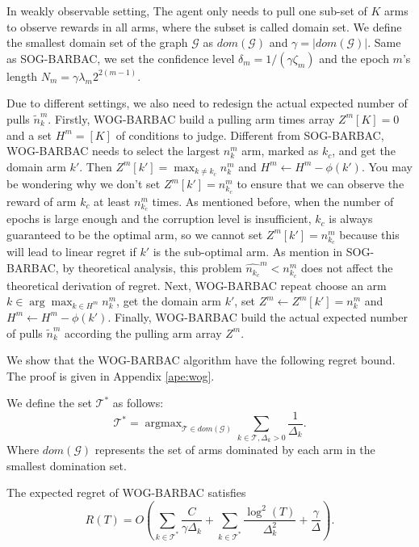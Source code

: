 In weakly observable setting, The agent only needs to pull one sub-set of $K$ arms to observe rewards in all arms, where the subset is called domain set. We define the smallest domain set of the graph $\mathcal{G}$ as $dom(\mathcal{G})$ and $\gamma = |dom(\mathcal{G})|$. Same as SOG-BARBAC, we set the confidence level $\delta_m = 1/(\gamma\zeta_m)$ and the epoch $m$'s length $N_m = \gamma \lambda_m 2^{2(m-1)}$.

Due to different settings, we also need to redesign the actual expected number of pulls $\widetilde{n}_k^m$. Firstly, WOG-BARBAC build a pulling arm times array $Z^m[K] = {0}$ and a set $H^m = [K]$ of conditions to judge. Different from SOG-BARBAC, WOG-BARBAC needs to select the largest $n_k^m$ arm, marked as $k_c$, and get the domain arm $k'$. Then $Z^m[k'] = \max_{k \neq k_c}n_k^m$ and $H^m \leftarrow H^m - \phi(k')$. You may be wondering why we don’t set $Z^m[k'] = n_{k_c}^m$ to ensure that we can observe the reward of arm $k_c$ at least 
$n_{k_c}^m$ times. As mentioned before, when the number of epochs is large enough and the
corruption level is insufficient, $k_c$ is always guaranteed to be the optimal arm, so we 
cannot set $Z^m[k'] = n_{k_c}^m$ because this will lead to linear regret if $k'$ is the sub-optimal arm. As mention in SOG-BARBAC, by theoretical analysis, this problem $\hat{n_{k_c}}^m < n_{k_c}^m$ does not affect the theoretical derivation of regret. Next, WOG-BARBAC repeat choose an arm $k \in \arg\max_{k \in H^m}n_k^m$, get the domain arm $k'$, set $Z^m \leftarrow Z^m [k'] = n_k^m$ and $H^m \leftarrow H^m - \phi(k')$. Finally, WOG-BARBAC build the actual expected number of pulls $\widetilde{n}_k^m$ according the pulling arm array $Z^m$.

We show that the WOG-BARBAC algorithm have the following regret bound. The proof is given in Appendix \ref{ape:wog}.

\begin{theorem}
\label{the:wog-erm}    %
    We define the set $\mathcal{T}^*$ as follows:
    \[\mathcal{T}^* = \mathop{\arg\max}_{\mathcal{T} \in dom(\mathcal{G})}\sum_{k \in \mathcal{T}, \Delta_k > 0}\frac{1}{\Delta_k}.\]
    Where $dom(\mathcal{G})$ represents the set of arms dominated by each arm in the smallest domination set.
    
    The expected regret of WOG-BARBAC satisfies
    \[R(T) = O\left(\sum_{k \in \mathcal{T}^*}\frac{C}{\gamma\Delta_k} + \sum_{k \in \mathcal{T}^*}\frac{\log^2(T)}{\Delta_{k}^2} + \frac{\gamma}{\Delta}\right).\]
\end{theorem}